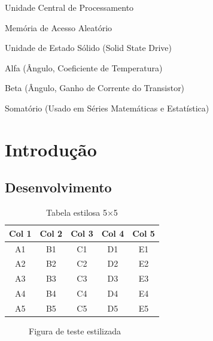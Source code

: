 \documentclass{Arquivos/AcademicoPadrao}
\begin{document}
\begin{siglas}
    \item[CPU] Unidade Central de Processamento
    \item[RAM] Memória de Acesso Aleatório
    \item[SSD] Unidade de Estado Sólido (Solid State Drive)
\end{siglas}


\begin{simbolos}
    \item[$\alpha$] Alfa (Ângulo, Coeficiente de Temperatura)
    \item[$\beta$] Beta (Ângulo, Ganho de Corrente do Transistor)
    \item[$\sum$] Somatório (Usado em Séries Matemáticas e Estatística)
\end{simbolos}


\Sumario


\textual %


\chapter{Introdução}
\section{Desenvolvimento}
\begin{table}[ht]
    \centering
    \caption{Tabela estilosa 5×5}
    \label{tab:estilosa}
    \begin{tabular}{ccccc}
        \toprule
        Col 1 & Col 2 & Col 3 & Col 4 & Col 5 \\
        \midrule
        A1 & B1 & C1 & D1 & E1 \\
        A2 & B2 & C2 & D2 & E2 \\
        A3 & B3 & C3 & D3 & E3 \\
        A4 & B4 & C4 & D4 & E4 \\
        A5 & B5 & C5 & D5 & E5 \\
        \bottomrule
    \end{tabular}
\end{table}

\begin{figure}[ht]
    \centering
    \caption{Figura de teste estilizada}
    \label{fig:teste-estilosa}
\end{figure}
\end{document}
